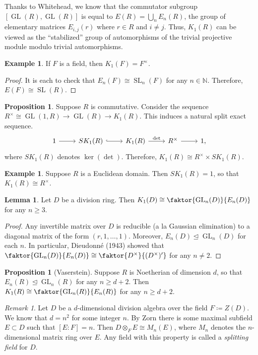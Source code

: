 \documentclass[10pt,letterpaper,cm]{nupset}
\theoremstyle{definition}
\newtheorem{exmp}[definition]{Example}
\theoremstyle{theorem}
\newtheorem{lemma}[theorem]{Lemma}
\newtheorem{prop}[theorem]{Proposition}
\theoremstyle{remark}
\newtheorem{remark}{Remark}
\newcommand{\N}{\mathbb N}
\newcommand{\1}{\mathbf{1}}
\newcommand{\0}{\vec 0}
\DeclareMathOperator*{\GL}{GL}
\DeclareMathOperator*{\SL}{SL}
\begin{document}
Thanks to Whitehead, we know that the commutator subgroup $[\GL(R), \GL(R)]$ is equal to $E(R) = \bigcup_n E_n(R)$, the group of elementary matrices $E_{i, j}(r)$ where $r \in R$ and $i\ne j$. Thus, $K_1(R)$ can be viewed as the ``stabilized'' group of automorphisms of the trivial projective module modulo trivial automorphisms.


\begin{exmp}
If $F$ is a field, then $K_1(F) = F^{\times}$.
\end{exmp}
\begin{proof}
It is each to check that $E_n(F) \cong \SL_n(F)$ for any $n\in \N$. Therefore, $E(F) \cong \SL(R)$.
\end{proof}

\begin{prop}
Suppose $R$ is commutative. Consider the sequence $R^{\times} \cong \GL(1, R) \to \GL(R) \to K_1(R)$. This induces a natural split exact sequence.
\[
\begin{tikzcd}
1 \arrow[r] & SK_1(R) \arrow[r, hook] & K_1(R) \arrow[r, "\det"] & R^{\times} \arrow[r] & 1,
\end{tikzcd}
\]
where $SK_1(R)$ denotes $\ker(\det)$. Therefore, $K_1(R) \cong R^{\times} \times SK_1(R)$.
\end{prop}

\begin{exmp}
Suppose $R$ is a Euclidean domain. Then $SK_1(R) =1$, so that $K_1(R) \cong R^{\times}$.
\end{exmp}

\begin{lemma}
Let $D$ be a division ring. Then $K_1(D) \cong \faktor{\GL_n(D)}{E_n(D)}$ for any $n\geq 3$.
\end{lemma}
\begin{proof}
Any invertible matrix over $D$ is reducible (a la Gaussian elimination) to a diagonal matrix of the form $(r, 1, \ldots, 1)$. Moreover, $E_n(D)\unlhd \GL_n(D)$ for each $n$. In particular, Dieudonn\'e (1943) showed that  $\faktor{\GL_n(D)}{E_n(D)} \cong \faktor{D^{\times}}{(D^{\times})'}$ for any $n\ne 2$. 
\end{proof}

\begin{prop}[Vaserstein]
Suppose $R$ is Noetherian of dimension $d$, so that $E_n(R)\unlhd \GL_n(R)$ for any $n\geq d+2$. Then $K_1(R) \cong \faktor{\GL_n(R)}{E_n(R)}$ for any $n \geq d+2$. 
\end{prop}

\begin{remark}
Let $D$ be a $d$-dimensional division algebra over the field $F\coloneqq Z(D)$. We know that $d =n^2$ for some integer $n$. By Zorn there is some maximal subfield $E\subset D$ such that $[E : F] = n$. Then $D \otimes_F E \cong M_n(E)$, where $M_n$ denotes the $n$-dimensional matrix ring over $E$. Any field with this property is called a \textit{splitting field} for $D$.
\end{remark}
\end{document}
